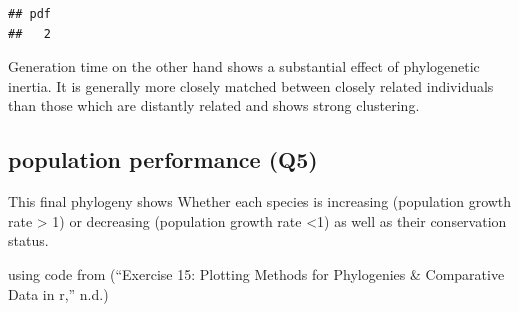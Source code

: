 \documentclass[
]{article}
\begin{document}
\begin{verbatim}
## pdf 
##   2
\end{verbatim}



Generation time on the other hand shows a substantial effect of
phylogenetic inertia. It is generally more closely matched between
closely related individuals than those which are distantly related and
shows strong clustering.

\subsection{population performance
(Q5)}\label{population-performance-q5}

This final phylogeny shows Whether each species is increasing
(population growth rate \textgreater{} 1) or decreasing (population
growth rate \textless1) as well as their conservation status.

using code from ({``Exercise 15: Plotting Methods for Phylogenies \&
Comparative Data in r,''} n.d.)
\end{document}
